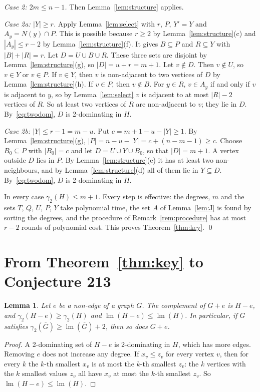 \documentclass[11pt,a4paper]{article}
\newtheorem{lemma}[theorem]{Lemma}
\theoremstyle{remark}
\newcommand{\lm}{\operatorname{lm}}
\newcommand{\Gc}{\overline{G}}
\begin{document}
\emph{Case 2: $2m\le n-1$.} Then Lemma~\ref{lem:structure} applies.

\emph{Case 2a: $|Y|\ge r$.} Apply Lemma~\ref{lem:select} with $r$, $P$, $Y'=Y$ and
$A_y=N(y)\cap P$. This is possible because $r\ge 2$ by Lemma~\ref{lem:structure}(c) and
$|A_y|\le r-2$ by Lemma~\ref{lem:structure}(f). It gives $B\subseteq P$ and $R\subseteq Y$ with
$|B|+|R|=r$. Let $D=U\cup B\cup R$. These three sets are disjoint by
Lemma~\ref{lem:structure}(g), so $|D|=u+r=m+1$. Let $v\notin D$. Then $v\notin U$, so $v\in Y$
or $v\in P$. If $v\in Y$, then $v$ is non-adjacent to two vertices of $D$ by
Lemma~\ref{lem:structure}(h). If $v\in P$, then $v\notin B$. For $y\in R$, $v\in A_y$ if and only
if $v$ is adjacent to $y$, so by Lemma~\ref{lem:select} $v$ is adjacent to at most $|R|-2$
vertices of $R$. So at least two
vertices of $R$ are non-adjacent to $v$; they lie in $D$. By~\eqref{eq:twodom}, $D$ is
2-dominating in $H$.

\emph{Case 2b: $|Y|\le r-1=m-u$.} Put $c=m+1-u-|Y|\ge 1$. By Lemma~\ref{lem:structure}(g),
$|P|=n-u-|Y|=c+(n-m-1)\ge c$. Choose $B_0\subseteq P$ with $|B_0|=c$ and let
$D=U\cup Y\cup B_0$, so that $|D|=m+1$. A vertex outside $D$ lies in $P$. By
Lemma~\ref{lem:structure}(e) it has at least two non-neighbours, and by
Lemma~\ref{lem:structure}(d) all of them lie in $Y\subseteq D$. By~\eqref{eq:twodom}, $D$ is
2-dominating in $H$.

In every case $\gamma_2(H)\le m+1$. Every step is effective: the degrees, $m$ and the sets $T$,
$Q$, $U$, $P$, $Y$ take polynomial time, the set $A$ of Lemma~\ref{lem:J} is found by sorting
the degrees, and the procedure of Remark~\ref{rem:procedure} has at most $r-2$ rounds of
polynomial cost. This proves Theorem~\ref{thm:key}. \qed

\section{From Theorem~\ref{thm:key} to Conjecture 213}\label{sec:reduction}

\begin{lemma}\label{lem:mono}
Let $e$ be a non-edge of a graph $G$. The complement of $G+e$ is $H-e$, and
$\gamma_2(H-e)\ge\gamma_2(H)$ and $\lm(H-e)\le\lm(H)$. In particular, if $G$ satisfies
$\gamma_2(\Gc)\ge\lm(\Gc)+2$, then so does $G+e$.
\end{lemma}

\begin{proof}
A 2-dominating set of $H-e$ is 2-dominating in $H$, which has more edges. Removing $e$ does not
increase any degree. If $x_v\le z_v$ for every vertex $v$, then for every $k$ the $k$-th
smallest $x_v$ is at most the $k$-th smallest $z_v$: the $k$ vertices with the $k$ smallest
values $z_v$ all have $x_v$ at most the $k$-th smallest $z_v$. So $\lm(H-e)\le\lm(H)$.
\end{proof}
\end{document}
